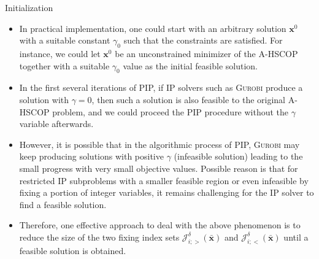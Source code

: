 \documentclass[aspectratio=169,xcolor=dvipsnames]{beamer}
\begin{document}
\begin{frame}{Initialization}
  \small
  \begin{itemize}
    \setlength{\itemsep}{0.12cm}
    \item In practical implementation, one could start with an arbitrary
      solution $\mathbf{x}^0$ with a suitable constant $\gamma_0$ such that the
      constraints are satisfied. For instance, we could let $\mathbf{x}^0$ be an
      unconstrained minimizer of the A-HSCOP together with a suitable $\gamma_0$
      value as the initial feasible solution.
    \item In the first several iterations of PIP, if IP solvers such as
      \textsc{Gurobi} produce a solution with $\gamma=0$, then such a solution
      is also feasible to the original A-HSCOP problem, and we could proceed the
      PIP procedure without the $\gamma$ variable afterwards.
    \item However, it is possible that in the algorithmic process of PIP,
      \textsc{Gurobi} may keep producing solutions with positive $\gamma$
      (infeasible solution) leading to the small progress with very small
      objective values. Possible reason is that for restricted IP subproblems
      with a smaller feasible region or even infeasible by fixing a portion of
      integer variables, it remains challenging for the IP solver to find a
      feasible solution.
    \item Therefore, one effective approach to deal with the above phenomenon is
      to reduce the size of the two fixing index sets
      $\mathcal{J}^\delta_{i;>}(\bar{\mathbf{x}})$ and
      $\mathcal{J}^\delta_{i;<}(\bar{\mathbf{x}})$ until a feasible solution is
      obtained.
  \end{itemize}
\end{frame}
\end{document}
